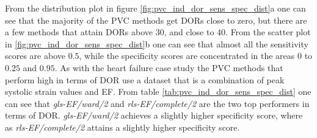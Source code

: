From the distribution plot in figure \ref{fig:pvc_ind_dor_sens_spec_dist}a one can see that the majority of the PVC methods get DORs close to zero,
but there are a few methods that attain DORs above 30, and close to 40. 
From the scatter plot in \ref{fig:pvc_ind_dor_sens_spec_dist}b one can see that almost all the sensitivity scores are above $0.5$, while the specificity scores are concentrated
in the areas $0$ to $0.25$ and $0.95$.
As with the heart failure case study the PVC methods that perform high in terms of DOR use a dataset that is a combination of peak systolic strain values and EF.
From table \ref{tab:pvc_ind_dor_sens_spec_dist} one can see that \textit{gls-EF/ward/2} and \textit{rls-EF/complete/2} are the two top performers in terms of DOR. 
\textit{gls-EF/ward/2} achieves a slightly higher specificity score, where as \textit{rls-EF/complete/2} attains a slightly higher specificity score.

